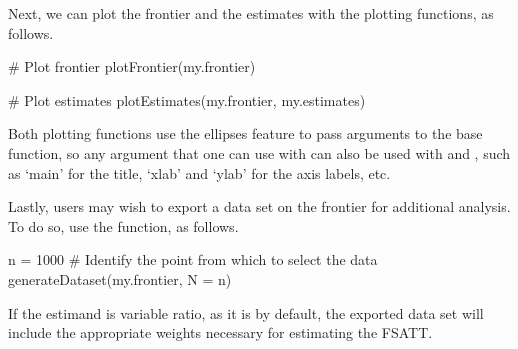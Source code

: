 \documentclass[nojss]{jss}
\begin{document}
Next, we can plot the frontier and the estimates with the plotting
functions, as follows. 

\begin{CodeChunk}
\begin{CodeInput}
# Plot frontier
plotFrontier(my.frontier)

# Plot estimates
plotEstimates(my.frontier, my.estimates)
\end{CodeInput}
\end{CodeChunk}

Both plotting functions use the ellipses feature to pass arguments to
the base  function, so any argument that one can use with
 can also be used with  and
, such as `main' for the title, `xlab' and
`ylab' for the axis labels, etc. 

Lastly, users may wish to export a data set on the frontier for 
additional analysis. To do so, use the  
function, as follows. 

\begin{CodeChunk}
\begin{CodeInput}
n = 1000 # Identify the point from which to select the data
generateDataset(my.frontier, N = n)
\end{CodeInput}
\end{CodeChunk}

If the estimand is variable ratio, as it is by default, the
exported data set will include the appropriate weights necessary
for estimating the FSATT.
\end{document}
